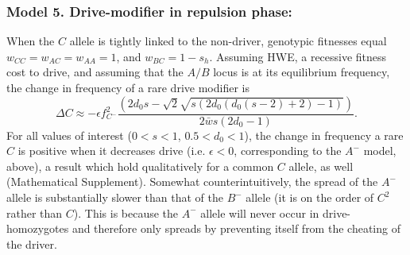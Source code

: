 \documentclass[12pt,letterpaper]{article}
\newcommand{\yb}[1]{{ \color{blue} #1}}
\begin{document}
\subsubsection*{Model 5. Drive-modifier in repulsion phase:}
When the $C$ allele is tightly linked to the non-driver, 
	genotypic fitnesses equal $w_{CC}=w_{AC}=w_{AA}=1$, and $w_{BC}=1-s_h$. 
Assuming HWE, a recessive fitness cost to drive, and assuming that the $A/B$ locus is at its equilibrium frequency, the change in frequency of a rare drive modifier is
\begin{equation}
	\Delta C \approx -\epsilon f_{C^-}^2 \frac{ \left(2 d_0 s-\sqrt{2} \sqrt{s (2 d_0 (d_0 (s-2)+2)-1)}\right)}{2\bar{w}s (2 d_0 -1) }. \label{A-}
\end{equation}
For all values of interest ($0<s<1$, $0.5<d_0<1$), the change in frequency a rare $C$ is positive when it decreases drive (i.e. $\epsilon <0$, corresponding to the $A^-$ model, above), a result which hold qualitatively for a common $C$ allele, as well (Mathematical Supplement). 
Somewhat counterintuitively, the spread of the $A^-$ allele is substantially slower than that of the $B^-$ allele (it is on the order of $C^{2}$ rather than $C$). 
This is because the $A^-$ allele will never occur in drive-homozygotes and therefore only spreads by preventing itself from the cheating of the driver.
\end{document}

